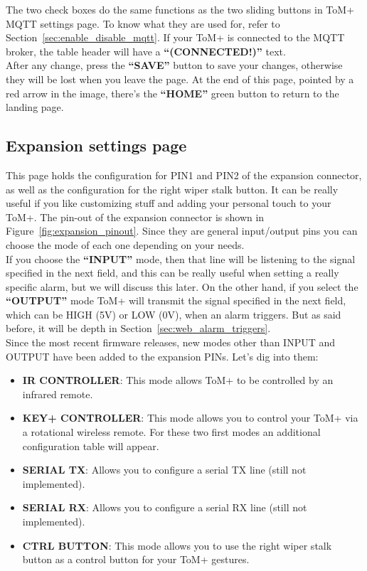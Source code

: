 The two check boxes do the same functions as the two sliding buttons in ToM+ MQTT
settings page. To know what they are used for, refer to Section~\ref{sec:enable_disable_mqtt}.
If your ToM+ is connected to the MQTT broker, the table header will have a \textbf{“(CONNECTED!)”} text.\\

After any change, press the \textbf{“SAVE”} button to save your changes, otherwise they will be lost when you leave the page.
At the end of this page, pointed by a red arrow in the image, there's the \textbf{“HOME”} green button to return to the landing page.


\subsection{Expansion settings page}
\label{sec:web_expansion_settings}

This page holds the configuration for PIN1 and PIN2 of the expansion connector, as well as the configuration for the right wiper stalk button.
It can be really useful if you like customizing stuff and adding your personal touch to your ToM+.
The pin-out of the expansion connector is shown in Figure~\ref{fig:expansion_pinout}. 
Since they are general input/output pins you can choose the mode of each one depending on your needs.\\

If you choose the \textbf{“INPUT”} mode, then that line will be listening to the signal specified
in the next field, and this can be really useful when setting a really specific alarm, but
we will discuss this later. On the other hand, if you select the \textbf{“OUTPUT”} mode ToM+
will transmit the signal specified in the next field, which can be HIGH (5V) or LOW
(0V), when an alarm triggers. But as said before, it will be depth in Section~\ref{sec:web_alarm_triggers}.\\

Since the most recent firmware releases, new modes other than INPUT and OUTPUT have been added to the expansion PINs. Let's dig into them:\\

\begin{itemize}
    \item \textbf{IR CONTROLLER}: This mode allows ToM+ to be controlled by an infrared remote.
    \item \textbf{KEY+ CONTROLLER}: This mode allows you to control your ToM+ via a rotational wireless remote. For these two first modes an additional configuration table will appear.
    \item \textbf{SERIAL TX}: Allows you to configure a serial TX line (still not implemented).
    \item \textbf{SERIAL RX}: Allows you to configure a serial RX line (still not implemented).
    \item \textbf{CTRL BUTTON}: This mode allows you to use the right wiper stalk button as a control button for your ToM+ gestures.
\end{itemize}

